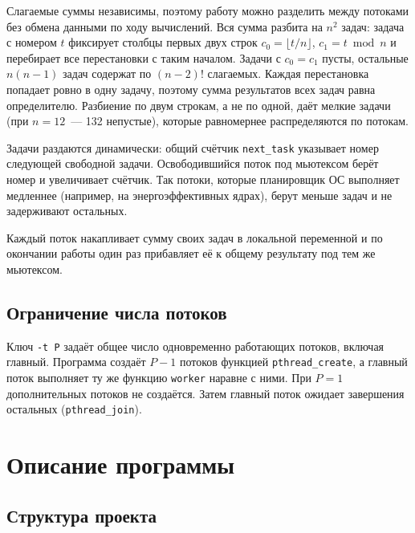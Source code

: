 \documentclass[pdf, unicode, 12pt, a4paper, oneside, fleqn]{article}
\begin{document}
Слагаемые суммы независимы, поэтому работу можно разделить между потоками без обмена
данными по ходу вычислений. Вся сумма разбита на $n^2$ задач: задача с номером $t$
фиксирует столбцы первых двух строк $c_0 = \lfloor t / n \rfloor$, $c_1 = t \bmod n$
и перебирает все перестановки с таким началом. Задачи с $c_0 = c_1$ пусты, остальные
$n(n-1)$ задач содержат по $(n-2)!$ слагаемых. Каждая перестановка попадает ровно в одну
задачу, поэтому сумма результатов всех задач равна определителю. Разбиение по двум строкам,
а не по одной, даёт мелкие задачи (при $n = 12$~--- 132 непустые), которые равномернее
распределяются по потокам.

Задачи раздаются динамически: общий счётчик \texttt{next\_task} указывает номер следующей
свободной задачи. Освободившийся поток под мьютексом берёт номер и увеличивает счётчик.
Так потоки, которые планировщик ОС выполняет медленнее (например, на энергоэффективных
ядрах), берут меньше задач и не задерживают остальных.

Каждый поток накапливает сумму своих задач в локальной переменной и по окончании работы
один раз прибавляет её к общему результату под тем же мьютексом.

\subsection*{Ограничение числа потоков}

Ключ \texttt{-t P} задаёт общее число одновременно работающих потоков, включая главный.
Программа создаёт $P - 1$ потоков функцией \texttt{pthread\_create}, а главный поток
выполняет ту же функцию \texttt{worker} наравне с ними. При $P = 1$ дополнительных
потоков не создаётся. Затем главный поток ожидает завершения остальных (\texttt{pthread\_join}).

\section{Описание программы}

\subsection*{Структура проекта}
\end{document}
